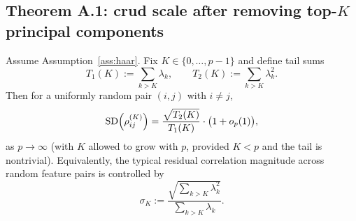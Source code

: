 \subsection{Theorem A.1: crud scale after removing top-$K$ principal components}

\begin{theorem}\label{thm:crud-scale}
Assume Assumption~\ref{ass:haar}. Fix $K\in\{0,\ldots,p-1\}$ and define tail sums
\begin{equation}
T_1(K) := \sum_{k>K}\lambda_k,\qquad T_2(K) := \sum_{k>K}\lambda_k^2.
\end{equation}
Then for a uniformly random pair $(i,j)$ with $i\neq j$,
\begin{equation}
\operatorname{SD}\!\left(\rho^{(K)}_{ij}\right) = \frac{\sqrt{T_2(K)}}{T_1(K)}\cdot \bigl(1+o_p(1)\bigr),
\end{equation}
as $p\to\infty$ (with $K$ allowed to grow with $p$, provided $K<p$ and the tail is nontrivial).
Equivalently, the typical residual correlation magnitude across random feature pairs is controlled by
\begin{equation}
\sigma_K := \frac{\sqrt{\sum_{k>K}\lambda_k^2}}{\sum_{k>K}\lambda_k}.
\end{equation}
\end{theorem}

